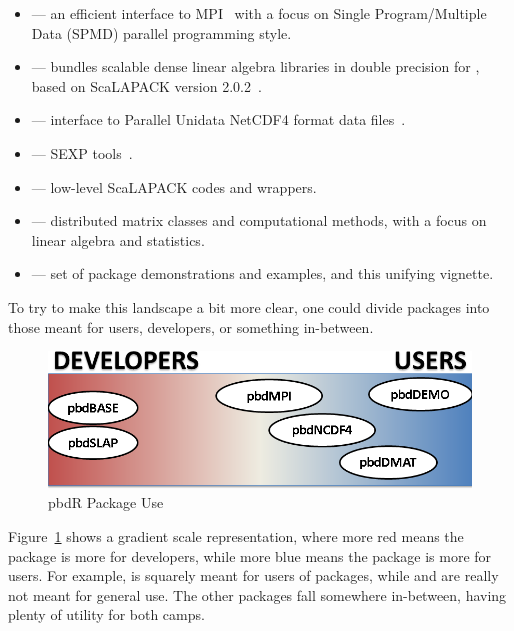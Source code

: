 \begin{itemize}
 \item {} --- an efficient interface to MPI~\citep{MPI1994} with a
       focus on Single Program/Multiple Data (SPMD)
       parallel programming style.
 \item {} --- bundles scalable dense linear algebra libraries in
       double precision for , based on ScaLAPACK
       version 2.0.2~\citep{slug}.~
 \item {} --- interface to Parallel Unidata
       NetCDF4 format data files~\citep{netcdf}.
 \item {} --- SEXP tools~\citep{SEXPtools}.
 \item {} --- low-level ScaLAPACK codes and wrappers.
 \item {} --- distributed matrix classes and computational methods,
       with a focus on linear algebra and statistics.
 \item {} --- set of package demonstrations and examples, and this
       unifying vignette.
\end{itemize}

To try to make this landscape a bit more clear, one could divide
\pbdR packages into those meant for users, developers, or
something in-between.  
\begin{figure}[h]
 \centering
 \includegraphics[scale=.55]{pbdDEMO-include/pics/pbdR-packages.png}
 \caption{pbdR Package Use}
 \label{fig:pbdrpackages2}
\end{figure}
Figure~\ref{fig:pbdrpackages2} shows a gradient scale representation, where
more red means the package is more for developers, while more blue means the
package is more for users.  For example,  is squarely meant for
users of \pbdR packages, while  and  are
really not meant for general use. The other packages fall somewhere
in-between, having plenty of utility for both camps.

